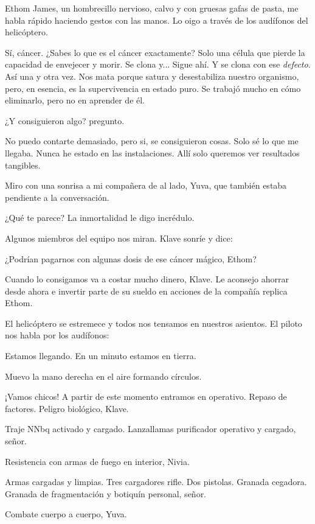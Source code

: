 Ethom James, un hombrecillo nervioso, calvo y con gruesas gafas de pasta, me habla rápido haciendo gestos con las manos. Lo oigo a través de los audífonos del helicóptero.

\reply Sí, cáncer. ¿Sabes lo que es el cáncer exactamente? Solo una célula que pierde la capacidad de envejecer y morir. Se clona y... Sigue ahí. Y se clona con ese \emph{defecto}. Así una y otra vez. Nos mata porque satura y desestabiliza nuestro organismo, pero, en esencia, es la supervivencia en estado puro. Se trabajó mucho en cómo eliminarlo, pero no en aprender de él.

\reply ¿Y consiguieron algo? \pause pregunto.

\reply No puedo contarte demasiado, pero si, se consiguieron cosas. Solo sé lo que me llegaba. Nunca he estado en las instalaciones. Allí solo queremos ver resultados tangibles.

Miro con una sonrisa a mi compañera de al lado, Yuva, que también estaba pendiente a la conversación.

\reply ¿Qué te parece? La inmortalidad \pause le digo incrédulo.

Algunos miembros del equipo nos miran. Klave sonríe y dice:

\reply ¿Podrían pagarnos con algunas dosis de ese cáncer mágico, Ethom?

\reply Cuando lo consigamos va a costar mucho dinero, Klave. Le aconsejo ahorrar desde ahora e invertir parte de su sueldo en acciones de la compañía \pause replica Ethom.

El helicóptero se estremece y todos nos tensamos en nuestros asientos. El piloto nos habla por los audífonos:

\reply Estamos llegando. En un minuto estamos en tierra.

Muevo la mano derecha en el aire formando círculos.

\reply ¡Vamos chicos! A partir de este momento entramos en operativo. Repaso de factores. Peligro biológico, Klave.

\reply Traje NNbq activado y cargado. Lanzallamas purificador operativo y cargado, señor.

\reply Resistencia con armas de fuego en interior, Nivia.

\reply Armas cargadas y limpias. Tres cargadores rifle. Dos pistolas. Granada cegadora. Granada de fragmentación y botiquín personal, señor.

\reply Combate cuerpo a cuerpo, Yuva.

